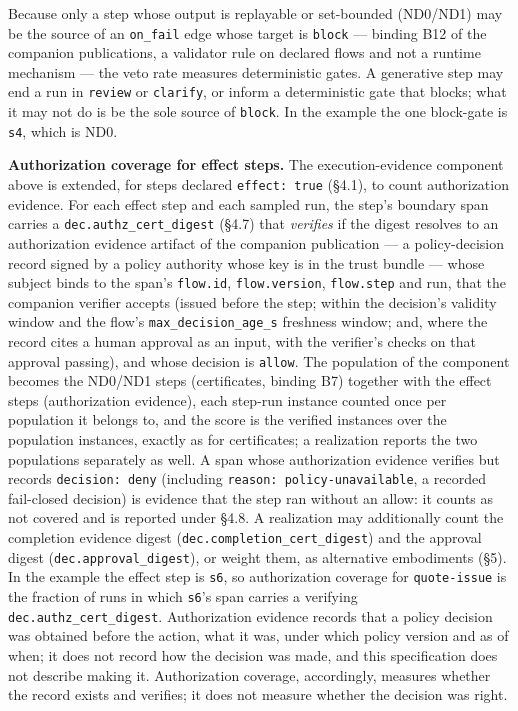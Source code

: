 \documentclass[11pt]{article}
\newcommand{\code}[1]{\texttt{#1}}
\begin{document}
Because only a step whose output is replayable or set-bounded (ND0/ND1) may be the source of an \code{on\_fail} edge whose target is \code{block} --- binding B12 of the companion publications, a validator rule on declared flows and not a runtime mechanism --- the veto rate measures deterministic gates. A generative step may end a run in \code{review} or \code{clarify}, or inform a deterministic gate that blocks; what it may not do is be the sole source of \code{block}. In the example the one block-gate is \code{s4}, which is ND0.

\textbf{Authorization coverage for effect steps.} The execution-evidence component above is extended, for steps declared \code{effect: true} (\S4.1), to count authorization evidence. For each effect step and each sampled run, the step's boundary span carries a \code{dec.authz\_cert\_digest} (\S4.7) that \emph{verifies} if the digest resolves to an authorization evidence artifact of the companion publication --- a policy-decision record signed by a policy authority whose key is in the trust bundle --- whose subject binds to the span's \code{flow.id}, \code{flow.version}, \code{flow.step} and run, that the companion verifier accepts (issued before the step; within the decision's validity window and the flow's \code{max\_decision\_age\_s} freshness window; and, where the record cites a human approval as an input, with the verifier's checks on that approval passing), and whose decision is \code{allow}. The population of the component becomes the ND0/ND1 steps (certificates, binding B7) together with the effect steps (authorization evidence), each step-run instance counted once per population it belongs to, and the score is the verified instances over the population instances, exactly as for certificates; a realization reports the two populations separately as well. A span whose authorization evidence verifies but records \code{decision: deny} (including \code{reason: policy-unavailable}, a recorded fail-closed decision) is evidence that the step ran without an allow: it counts as not covered and is reported under \S4.8. A realization may additionally count the completion evidence digest (\code{dec.completion\_cert\_digest}) and the approval digest (\code{dec.approval\_digest}), or weight them, as alternative embodiments (\S5). In the example the effect step is \code{s6}, so authorization coverage for \code{quote-issue} is the fraction of runs in which \code{s6}'s span carries a verifying \code{dec.authz\_cert\_digest}. Authorization evidence records that a policy decision was obtained before the action, what it was, under which policy version and as of when; it does not record how the decision was made, and this specification does not describe making it. Authorization coverage, accordingly, measures whether the record exists and verifies; it does not measure whether the decision was right.
\end{document}
